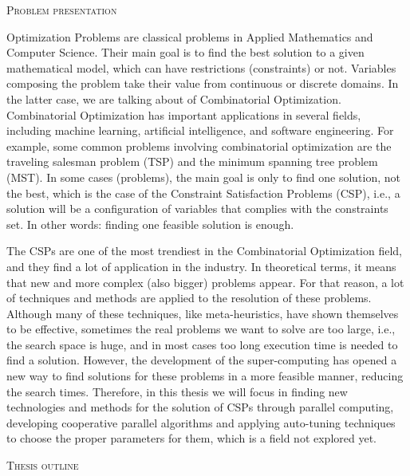  \Large\textsc{Problem presentation}\normalsize
 
 Optimization Problems are classical problems in Applied Mathematics and Computer Science. Their main goal is to find the best solution to a given mathematical model, which can have restrictions (constraints) or not. Variables composing the problem take their value from continuous or discrete domains. In the latter case, we are talking about of Combinatorial Optimization. Combinatorial Optimization has important applications in several fields, including machine learning, artificial intelligence, and software engineering. For example, some common problems involving combinatorial optimization are the traveling salesman problem (TSP) and the minimum spanning tree problem (MST). In some cases (problems), the main goal is only to find one solution, not the best, which is the case of the Constraint Satisfaction Problems (CSP), i.e., a solution will be a configuration of variables that complies with the constraints set. In other words: finding one feasible solution is enough.
 
 The CSPs are one of the most trendiest in the Combinatorial Optimization field, and they find a lot of application in the industry. In theoretical terms, it means that new and more complex (also bigger) problems appear. For that reason, a lot of techniques and methods are applied to the resolution of these problems. Although many of these techniques, like meta-heuristics, have shown themselves to be effective, sometimes the real problems we want to solve are too large, i.e., the search space is huge, and in most cases too long execution time is needed to find a
 solution. However, the development of the super-computing has opened a new way to find solutions for these problems in a more feasible manner, reducing the search times. Therefore, in this thesis we will focus in finding new technologies and methods for the solution of CSPs through parallel computing, developing cooperative parallel algorithms and applying auto-tuning techniques to choose the proper parameters for them, which is a field not explored yet.
 
\newpage
\Large\textsc{Thesis outline}\normalsize


